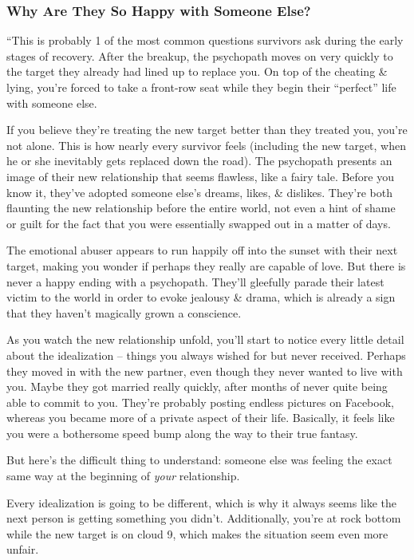 \documentclass{article}
\numberwithin{equation}{section}
\begin{document}
\subsubsection{Why Are They So Happy with Someone Else?}
``This is probably 1 of the most common questions survivors ask during the early stages of recovery. After the breakup, the psychopath moves on very quickly to the target they already had lined up to replace you. On top of the cheating \& lying, you're forced to take a front-row seat while they begin their ``perfect'' life with someone else.

If you believe they're treating the new target better than they treated you, you're not alone. This is how nearly every survivor feels (including the new target, when he or she inevitably gets replaced down the road). The psychopath presents an image of their new relationship that seems flawless, like a fairy tale. Before you know it, they've adopted someone else's dreams, likes, \& dislikes. They're both flaunting the new relationship before the entire world, not even a hint of shame or guilt for the fact that you were essentially swapped out in a matter of days.

The emotional abuser appears to run happily off into the sunset with their next target, making you wonder if perhaps they really are capable of love. But there is never a happy ending with a psychopath. They'll gleefully parade their latest victim to the world in order to evoke jealousy \& drama, which is already a sign that they haven't magically grown a conscience.

As you watch the new relationship unfold, you'll start to notice every little detail about the idealization -- things you always wished for but never received. Perhaps they moved in with the new partner, even though they never wanted to live with you. Maybe they got married really quickly, after months of never quite being able to commit to you. They're probably posting endless pictures on Facebook, whereas you became more of a private aspect of their life. Basically, it feels like you were a bothersome speed bump along the way to their true fantasy.

But here's the difficult thing to understand: someone else was feeling the exact same way at the beginning of \textit{your} relationship.

Every idealization is going to be different, which is why it always seems like the next person is getting something you didn't. Additionally, you're at rock bottom while the new target is on cloud 9, which makes the situation seem even more unfair.
\end{document}
